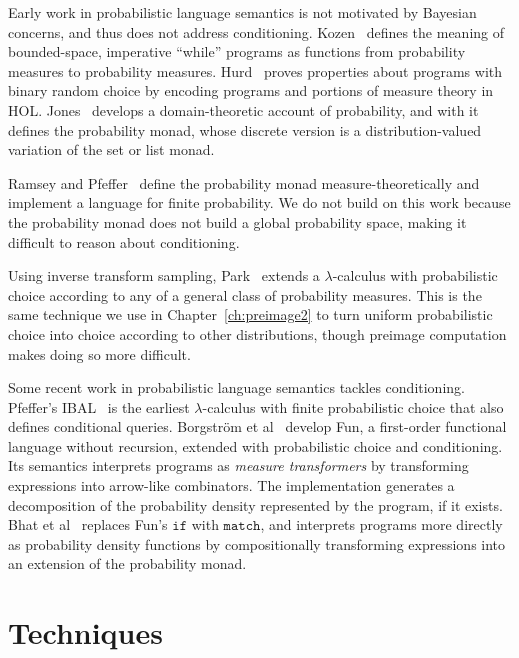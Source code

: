 Early work in probabilistic language semantics is not motivated by Bayesian concerns, and thus does not address conditioning.
Kozen~\cite{cit:kozen-1979fcs-prob-programs-short} defines the meaning of bounded-space, imperative ``while'' programs as functions from probability measures to probability measures.
Hurd~\cite{cit:hurd-2002thesis} proves properties about programs with binary random choice by encoding programs and portions of measure theory in HOL.
Jones~\cite{cit:jones-1990thesis} develops a domain-theoretic account of probability, and with it defines the probability monad, whose discrete version is a distribution-valued variation of the set or list monad.

Ramsey and Pfeffer~\cite{cit:ramsey-2002popl-stochastic-short} define the probability monad measure-theoretically and implement a language for finite probability.
We do not build on this work because the probability monad does not build a global probability space, making it difficult to reason about conditioning.

Using inverse transform sampling, Park~\cite{cit:park-2008toplas-prob} extends a $\lambda$-calculus with probabilistic choice according to any of a general class of probability measures.
This is the same technique we use in Chapter~\ref{ch:preimage2} to turn uniform probabilistic choice into choice according to other distributions, though preimage computation makes doing so more difficult.

Some recent work in probabilistic language semantics tackles conditioning.
Pfeffer's IBAL~\cite{cit:pfeffer-2007chapter-ibal} is the earliest $\lambda$-calculus with finite probabilistic choice that also defines conditional queries.
Borgstr\"om et al~\cite{cit:borgstrom-2011esop-measure-transformer} develop Fun, a first-order functional language without recursion, extended with probabilistic choice and conditioning.
Its semantics interprets programs as \emph{measure transformers} by transforming expressions into arrow-like combinators.
The implementation generates a decomposition of the probability density represented by the program, if it exists.
Bhat et al~\cite{cit:bhat-2013etaps-densities} replaces Fun's $\mathtt{if}$ with $\mathtt{match}$, and interprets programs more directly as probability density functions by compositionally transforming expressions into an extension of the probability monad.

\section{Techniques}

